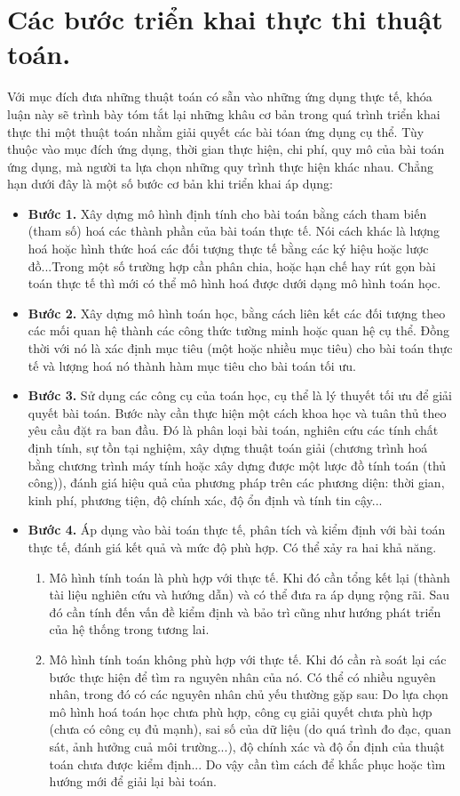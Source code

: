 \section{Các bước triển khai thực thi thuật toán. }
Với mục đích đưa những thuật toán có sẵn vào những ứng dụng thực tế, khóa luận này sẽ trình bày tóm tắt lại những khâu cơ bản trong quá trình triển khai thực thi một thuật toán nhằm giải quyết các bài tóan ứng dụng cụ thể. Tùy thuộc vào mục đích ứng dụng, thời gian thực hiện, chi phí, quy mô của bài toán ứng dụng, mà người ta lựa chọn những quy trình thực hiện khác nhau. Chẳng hạn dưới đây là một số bước cơ bản khi triển khai áp dụng:

\begin{itemize}
\item{\bf Bước 1. } Xây dựng mô hình định tính cho bài toán bằng cách tham biến (tham số) hoá các thành phần của bài toán thực tế. Nói cách khác là lượng hoá hoặc hình thức hoá các đối tượng thực tế bằng các ký hiệu hoặc lược đồ...Trong một số trường hợp cần phân chia, hoặc hạn chế hay rút gọn bài toán thực tế thì mới có thể mô hình hoá được dưới dạng mô hình toán học.
\item {\bf Bước 2. } Xây dựng mô hình toán học, bằng cách liên kết các đối tượng theo các mối quan hệ thành các công thức tường minh hoặc quan hệ cụ thể. Đồng thời với nó là xác định mục tiêu (một hoặc nhiều mục tiêu) cho bài toán thực tế và lượng hoá nó thành hàm mục tiêu cho bài toán tối ưu.
\item {\bf Bước 3. } Sử dụng các công cụ của toán học, cụ thể là lý thuyết tối ưu để giải quyết bài toán. Bước này cần thực hiện một cách khoa học và tuân thủ theo yêu cầu đặt ra ban đầu. Đó là phân loại bài toán, nghiên cứu các tính chất định tính, sự tồn tại nghiệm, xây dựng thuật toán giải (chương trình hoá bằng chương trình máy tính hoặc xây dựng được một lược đồ tính toán (thủ công)), đánh giá hiệu quả của phương pháp trên các phương diện: thời gian, kinh phí, phương tiện, độ chính xác, độ ổn định và tính tin cậy...
\item{\bf Bước 4. } Áp dụng vào bài toán thực tế, phân tích và kiểm định với bài toán thực tế, đánh giá kết quả và mức độ phù hợp. Có thể xảy ra hai khả năng.
\begin{enumerate}
\item Mô hình tính toán là phù hợp với thực tế. Khi đó cần tổng kết lại (thành tài liệu nghiên cứu và hướng dẫn) và có thể đưa ra áp dụng rộng rãi. Sau đó cần tính đến vấn đề kiểm định và bảo trì cũng như hướng phát triển của hệ thống trong tương lai.
\item Mô hình tính toán không phù hợp với thực tế. Khi đó cần rà soát lại các bước thực hiện để tìm ra nguyên nhân của nó. Có thể có nhiều nguyên nhân, trong đó có các nguyên nhân chủ yếu thường gặp sau: Do lựa chọn mô hình hoá toán học chưa phù hợp, công cụ giải quyết chưa phù hợp (chưa có công cụ đủ mạnh), sai số của dữ liệu (do quá trình đo đạc, quan sát, ảnh hưởng cuả môi trường...), độ chính xác và độ ổn định của thuật toán chưa được kiểm định... Do vậy cần tìm cách để khắc phục hoặc tìm hướng mới để giải lại bài toán.
\end{enumerate}
\end{itemize}
